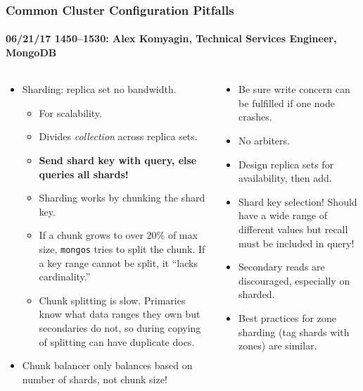 \documentclass[xcolor=dvipsnames, 9pt]{beamer}
\begin{document}
\begin{frame}
    \frametitle{Common Cluster Configuration Pitfalls}
    \framesubtitle{%
        06/21/17 1450--1530:
        Alex Komyagin, Technical Services Engineer, MongoDB
    }
    \begin{columns}
        \begin{column}{0.5\textwidth}
            \begin{itemize}
                \item Sharding: replica set no bandwidth.
                    \begin{itemize}
                        \item For scalability.
                        \item Divides \emph{collection} across replica sets.
                        \item \textbf{Send shard key with query, else queries all
                            shards!}
                        \item Sharding works by chunking the shard key.
                        \item If a chunk grows to over 20\% of max size,
                            \texttt{mongos} tries to split the chunk. If a key
                            range cannot be split, it ``lacks cardinality.''
                        \item Chunk splitting is slow. Primaries know what data
                            ranges they own but secondaries do not, so during
                            copying of splitting can have duplicate docs.
                    \end{itemize}
                \item Chunk balancer only balances based on number of shards, not
                    chunk size!
            \end{itemize}
        \end{column}
        \begin{column}{0.5\textwidth}
            \begin{itemize}
                \item Be sure write concern can be fulfilled if one node
                    crashes.
                \item No arbiters.
                \item Design replica sets for availability, then add.
                \item Shard key selection! Should have a wide range of different
                    values but recall must be included in query!
                \item Secondary reads are discouraged, especially on sharded.
                \item Best practices for zone sharding (tag shards with zones)
                    are similar.
            \end{itemize}
        \end{column}
    \end{columns}
\end{frame}
\end{document}
